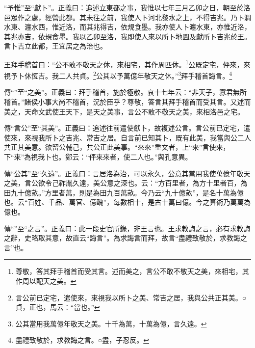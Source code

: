 {\noindent\shu{}\fzkt “予惟”至“獻卜”。正義曰：追述立東都之事，我惟以七年三月乙卯之日，朝至於洛邑眾作之處，經營此都。其未往之前，我使人卜河北黎水之上，不得吉兆。乃卜澗水東、瀍水西，惟近洛，而其兆得吉，依規食墨。我亦使人卜瀍水東，亦惟近洛，其兆亦吉，依規食墨。我以乙卯至洛，我即使人來以所卜地圖及獻所卜吉兆於王。言卜吉立此都，王宜居之為治也。 \par}

王拜手稽首曰：“公不敢不敬天之休，來相宅，其作周匹休。\footnote{尊敬，答其拜手稽首而受其言。述而美之，言公不敢不敬天之美，來相宅，其作周以配天之美。}公既定宅，伻來，來視予卜休恆吉。我二人共貞。\footnote{言公前已定宅，遣使來，來視我以所卜之美、常吉之居，我與公共正其美。○貞，正也，馬云：“當也。”}公其以予萬億年敬天之休。”\footnote{公其當用我萬億年敬天之美。十千為萬，十萬為億，言久遠。}拜手稽首誨言。\footnote{盡禮致敬於，求教誨之言。○盡，子忍反。}


{\noindent\zhuan{}\fzbyks 傳“”至“之美”。正義曰：拜手稽首，施於極敬。哀十七年云：“非天子，寡君無所稽首。”諸侯小事大尚不稽首，況於臣乎？尊敬，答言其拜手稽首而受其言。又述而美之，天命文武使王天下，是天之美事，言公不敢不敬天之美，來相洛邑之宅。 \par}

{\noindent\zhuan{}\fzbyks 傳“言公”至“其美”。正義曰：追述往前遣使獻卜，故複述公言。言公前已定宅，遣使來，來視我所卜之吉兆、常吉之居。自言前已知其卜，既有此美，我當與公二人共正其美意。欲留公輔己，共公正此美事。“來來”重文者，上“來”言使來，下“來”為視我卜也。鄭云：“伻來來者，使二人也。”與孔意異。 \par}

{\noindent\zhuan{}\fzbyks 傳“公其”至“久遠”。正義曰：言居洛為治，可以永久，公意其當用我使萬億年敬天之美，言公欲令己祚胤久遠，美公意之深也。云：“方百里者，為方十里者百，為田九十億畝。”方里者萬，則是為田九百萬畝。今乃云“九十億畝”，是名十萬為億也。云“百姓、千品、萬官、億醜”，每數相十，是古十萬曰億。今之算術乃萬萬為億也。 \par}

{\noindent\zhuan{}\fzbyks 傳“”至“之言”。正義曰：此一段史官所錄，非王言也。王求教誨之言，必有求教誨之辭，史略取其意，故直云“誨言”。為求誨言而拜，故言“盡禮致敬於，求教誨之言”也。 \par}

